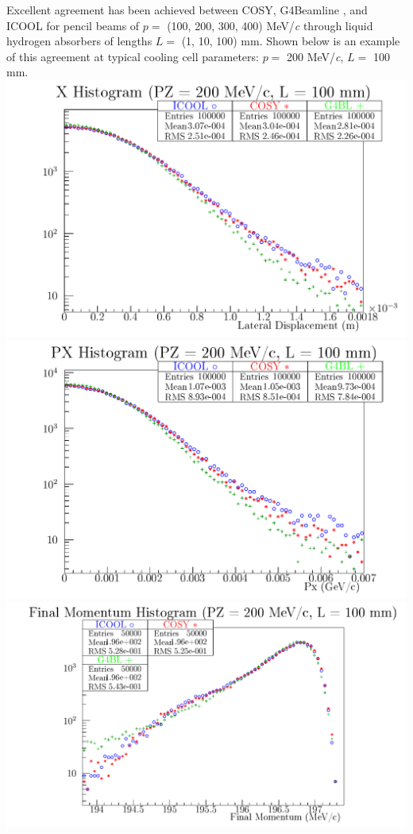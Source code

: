 \documentclass[portrait,a0paper,fontscale=0.285]{baposter} %
\begin{document}
\begin{poster}
{Excellent agreement has been achieved between COSY, G4Beamline \cite{g4bl}, and ICOOL \cite{icool} for pencil beams of $p =$ (100, 200, 300, 400) MeV/\textit{c} through liquid hydrogen absorbers of lengths $L =$ (1, 10, 100) mm. Shown below is an example of this agreement at typical cooling cell parameters: $p =$ 200 MeV/\textit{c}, $L =$ 100 mm.
\includegraphics[width=\textwidth]{Figures/LH.X.200.100.png}
\includegraphics[width=\textwidth]{Figures/LH.PX.200.100.png}
\includegraphics[width=\textwidth]{Figures/LH.strag.200.100.png}
}


\end{poster}
\end{document}
